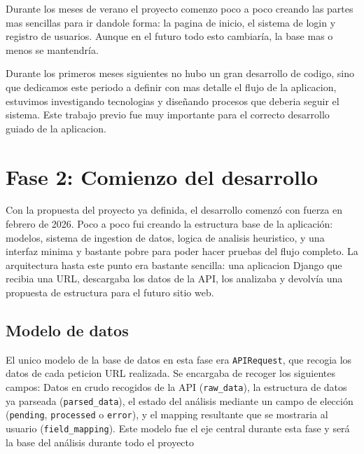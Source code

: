 Durante los meses de verano el proyecto comenzo poco a poco creando las partes mas sencillas para ir dandole forma: la pagina de inicio, el 
sistema de login y registro de usuarios. Aunque en el futuro todo esto cambiaría, la base mas  o menos se mantendría.



Durante los primeros meses siguientes no hubo un gran desarrollo de codigo, sino que dedicamos este periodo a definir con mas detalle el flujo
de la aplicacion, estuvimos investigando tecnologias y diseñando procesos que deberia seguir el sistema. Este trabajo previo fue muy importante
para el correcto desarrollo guiado de la aplicacion.


\section{Fase 2: Comienzo del desarrollo}
\label{sec:comienzo-desarrollo}

Con la propuesta del proyecto ya definida, el desarrollo comenzó con fuerza en febrero de 2026. Poco a poco fui creando la estructura base de 
la aplicación: modelos, sistema de ingestion de datos, logica de analisis heuristico, y una interfaz minima y bastante pobre para poder hacer
pruebas del flujo completo. La arquitectura hasta este punto era bastante sencilla: una aplicacion Django que recibia una URL, descargaba los 
datos de la API, los analizaba y devolvía una propuesta de estructura para el futuro sitio web.

\subsection{Modelo de datos}
\label{subsec:modelo-datos}

El unico modelo de la base de datos en esta fase era \texttt{APIRequest}, que recogia los datos de cada peticion URL realizada.
Se encargaba de recoger los siguientes campos: Datos en crudo recogidos de la API (\texttt{raw\_data}), la estructura de datos ya parseada (\texttt{parsed\_data}),
el estado del análisis mediante un campo de elección (\texttt{pending}, \texttt{processed} o \texttt{error}), y el mapping resultante que se mostraria al usuario
(\texttt{field\_mapping}). Este modelo fue el eje central durante esta fase y será la base del análisis durante todo el proyecto

